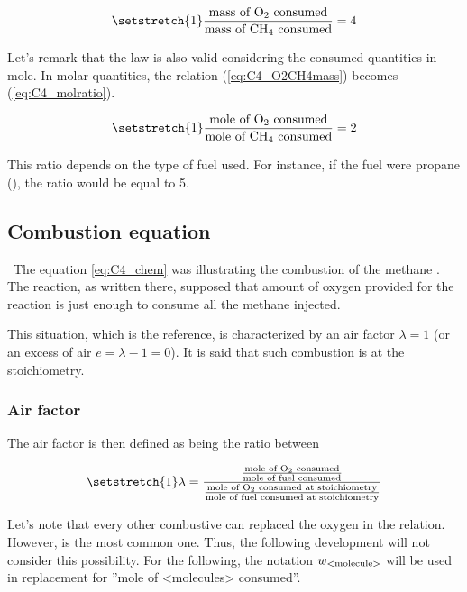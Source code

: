 \begin{equation}
    \setstretch{1}
    \frac{\text{mass of \ce{O2} consumed}}{\text{mass of \ce{CH4} consumed}} = 4 \label{eq:C4_O2CH4mass}
\end{equation}

Let's remark that the law is also valid considering the consumed quantities in mole. In molar quantities, the relation (\ref{eq:C4_O2CH4mass}) becomes (\ref{eq:C4_molratio}).

\begin{equation}
    \setstretch{1}
    \frac{\text{mole of \ce{O2} consumed}}{\text{mole of \ce{CH4} consumed}} = 2  \label{eq:C4_molratio}
\end{equation}

This ratio depends on the type of fuel used. For instance, if the fuel were propane (), the ratio would be equal to 5.

\subsection{Combustion equation}
\quad\ The equation \ref{eq:C4_chem} was illustrating the combustion of the methane . The reaction, as written there, supposed that amount of oxygen provided for the reaction is just enough to consume all the methane injected.

This situation, which is the reference, is characterized by an air factor \(\lambda = 1\) (or an excess of air \(e=\lambda-1=0\)). It is said that such combustion is at the stoichiometry.

\subsubsection{Air factor}
The air factor is then defined as being the ratio between

\begin{equation}
    \setstretch{1}
    \lambda = \frac{\frac{\text{mole of \ce{O2} consumed}}{\text{mole of fuel consumed}}}{\frac{\text{mole of \ce{O2} consumed at stoichiometry}}{\text{mole of fuel consumed at stoichiometry}}} \label{eq:C4_lbd}
\end{equation}

Let's note that every other combustive can replaced the oxygen in the relation. However,  is the most common one. Thus, the following development will not consider this possibility.
For the following, the notation \(w_{\ce{\text{<molecule>}}}\) will be used in replacement for ''mole of <molecules> consumed''.

